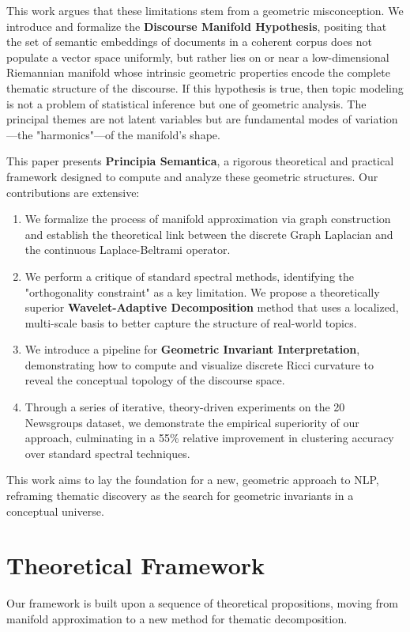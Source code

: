 \documentclass[11pt, letterpaper]{article}
\begin{document}
This work argues that these limitations stem from a geometric misconception. We introduce and formalize the \textbf{Discourse Manifold Hypothesis}, positing that the set of semantic embeddings of documents in a coherent corpus does not populate a vector space uniformly, but rather lies on or near a low-dimensional Riemannian manifold whose intrinsic geometric properties encode the complete thematic structure of the discourse. If this hypothesis is true, then topic modeling is not a problem of statistical inference but one of geometric analysis. The principal themes are not latent variables but are fundamental modes of variation—the "harmonics"—of the manifold's shape.

This paper presents \textbf{Principia Semantica}, a rigorous theoretical and practical framework designed to compute and analyze these geometric structures. Our contributions are extensive:
\begin{enumerate}
    \item We formalize the process of manifold approximation via graph construction and establish the theoretical link between the discrete Graph Laplacian and the continuous Laplace-Beltrami operator.
    \item We perform a critique of standard spectral methods, identifying the "orthogonality constraint" as a key limitation. We propose a theoretically superior \textbf{Wavelet-Adaptive Decomposition} method that uses a localized, multi-scale basis to better capture the structure of real-world topics.
    \item We introduce a pipeline for \textbf{Geometric Invariant Interpretation}, demonstrating how to compute and visualize discrete Ricci curvature to reveal the conceptual topology of the discourse space.
    \item Through a series of iterative, theory-driven experiments on the 20 Newsgroups dataset, we demonstrate the empirical superiority of our approach, culminating in a 55\% relative improvement in clustering accuracy over standard spectral techniques.
\end{enumerate}

This work aims to lay the foundation for a new, geometric approach to NLP, reframing thematic discovery as the search for geometric invariants in a conceptual universe.

\section{Theoretical Framework}
Our framework is built upon a sequence of theoretical propositions, moving from manifold approximation to a new method for thematic decomposition.
\end{document}
